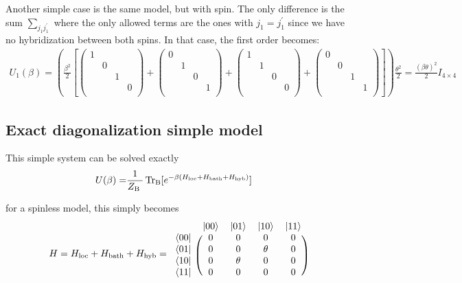 \documentclass[10pt,letter]{article}
\begin{document}
Another simple case is the same model, but with spin. The only difference is the sum $\sum_{j_1 j_1^\prime}$ where the only allowed terms are the ones with $j_1=j_1^\prime$ since we have no hybridization between both spins. In that case, the first order becomes:
\begin{align}
U_1(\beta)=
\left(\frac{\beta^2}{2}
\left[
\begin{pmatrix} 
  1&&&\\ 
  &0&&\\ 
  &&1&\\ 
  &&&0\\ 
\end{pmatrix}
+
\begin{pmatrix} 
  0&&&\\ 
  &1&&\\ 
  &&0&\\ 
  &&&1\\ 
\end{pmatrix}
+
\begin{pmatrix} 
  1&&&\\ 
  &1&&\\ 
  &&0&\\ 
  &&&0\\ 
\end{pmatrix}
+
\begin{pmatrix} 
  0&&&\\ 
  &0&&\\ 
  &&1&\\ 
  &&&1\\ 
\end{pmatrix}
\right]
\right)
\frac{\theta^2}{2}
=
\frac{(\beta \theta)^2}{2} I_{4 \times 4}
\label{eq::first_order2}
\end{align}

\subsection{Exact diagonalization simple model}
\label{ED_simple}

This simple system can be solved exactly
\begin{align}
U(\beta)=& \frac{1}{Z_{\text {B }}}\operatorname{Tr_B} [e^{-\beta (H_\text{loc} + H_\text{bath} + H_\text{hyb}) }]  
\end{align}

for a spinless model, this simply becomes
\begin{align}
H=
H_\text{loc} + H_\text{bath} + H_\text{hyb}=
\begin{blockarray}{ccccc}
& \ket{00} & \ket{01} & \ket{10} & \ket{11} \\
\begin{block}{c(cccc)}
\bra{00} & 0&0&0&0\\
\bra{01} & 0&0&\theta&0\\
\bra{10} & 0&\theta&0&0\\
\bra{11} & 0&0&0&0\\
\end{block}
\end{blockarray}
\end{align}
\end{document}
